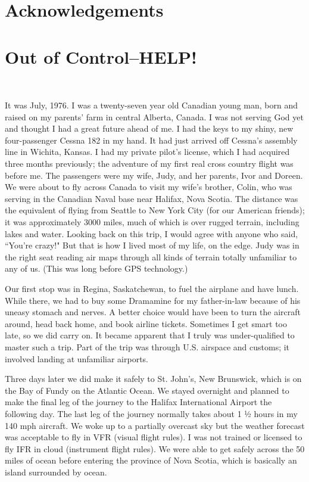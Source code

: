 \documentclass[oneside]{book}
\begin{document}
\chapter{Acknowledgements}
\lipsum[1]
\clearpage
\tableofcontents
\clearpage
\mainmatter
\chapter{Out of Control--HELP!}
\

It was July, 1976. I was a twenty-seven year old Canadian young man, born and raised on my parents' farm in central Alberta, Canada. I was not serving God yet and thought I had a great future ahead of me. I had the keys to my shiny, new four-passenger Cessna 182 in my hand. It had just arrived off Cessna's assembly line in Wichita, Kansas. I had my private pilot's license, which I had acquired three months previously; the adventure of my first real cross country flight was before me. The passengers were my wife, Judy, and her parents, Ivor and Doreen. We were about to fly across Canada to visit my wife's brother, Colin, who was serving in the Canadian Naval base near Halifax, Nova Scotia. The distance was the equivalent of flying from Seattle to New York City (for our American friends); it was approximately 3000 miles, much of which is over rugged terrain, including lakes and water. Looking back on this trip, I would agree with anyone who said, ``You're crazy!" But that is how I lived most of my life, on the edge. Judy was in the right seat reading air maps through all kinds of terrain totally unfamiliar to any of us. (This was long before GPS technology.)

Our first stop was in Regina, Saskatchewan, to fuel the airplane and have lunch. While there, we had to buy some Dramamine for my father-in-law because of his uneasy stomach and nerves. A better choice would have been to turn the aircraft around, head back home, and book airline tickets. Sometimes I get smart too late, so we did carry on. It became apparent that I truly was under-qualified to master such a trip. Part of the trip was through U.S. airspace and customs; it involved landing at unfamiliar airports. 

Three days later we did make it safely to St. John's, New Brunswick, which is on the Bay of Fundy on the Atlantic Ocean. We stayed overnight and planned to make the final leg of the journey to the Halifax International Airport the following day. The last leg of the journey normally takes about 1 ½ hours in my 140 mph aircraft. We woke up to a partially overcast sky but the weather forecast was acceptable to fly in VFR (visual flight rules). I was not trained or licensed to fly IFR in cloud (instrument flight rules). We were able to get safely across the 50 miles of ocean before entering the province of Nova Scotia, which is basically an island surrounded by ocean. 
\end{document}
